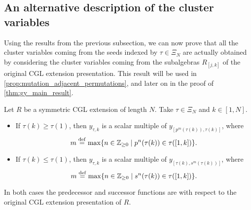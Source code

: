 \subsection{An alternative description of the cluster variables}

Using the results from the previous subsection, we can now prove that all the cluster
variables coming from the seeds indexed by $\tau \in \Xi_N$ are actually obtained by
considering the cluster variables coming from the subalgebras $R_{[j,k]}$ of the
original CGL extension presentation. This result will be used in
\cref{prop:mutation_adjacent_permutations}, and later on in the proof of
\cref{thm:gy_main_result}.

\begin{lemma}\label{lem:y_tauk_y_brackets}
	Let $R$ be a symmetric CGL extension of length $N$. Take $\tau \in \Xi_N$ and $k \in [1, N]$.
	\begin{itemize}
		\item If $\tau(k) \geq \tau(1)$, then $y_{\tau,k}$ is a scalar multiple of $y_{[p^m(\tau(k)),
							      \tau(k)]}$, where
		      \begin{equation*}
			      m \overset{\mathrm{def}}{=} \max\{n \in \mathbb{Z}_{\geq 0} \mid p^n(\tau(k)) \in \tau([1,k])\}.
		      \end{equation*}
		\item If $\tau(k) \leq \tau(1)$, then $y_{\tau,k}$ is a scalar multiple of $y_{[\tau(k),s^m(
							      \tau(k))]}$, where
		      \begin{equation*}
			      m \overset{\mathrm{def}}{=} \max\{n \in \mathbb{Z}_{\geq 0} \mid s^n(\tau(k)) \in \tau([1,k])\}.
		      \end{equation*}
	\end{itemize}
	In both cases the predecessor and successor functions are with respect to the original
	CGL extension presentation of $R$.
\end{lemma}
